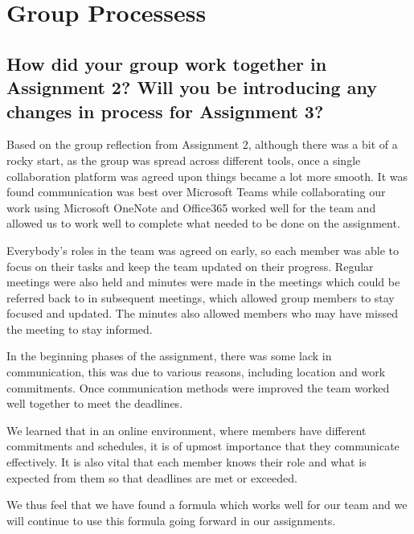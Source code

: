 \documentclass[11pt, oneside, a4paper, titlepage]{article}
\begin{document}
\section{Group Processess}

\subsection{How did your group work together in Assignment 2? Will you be introducing any changes in process for Assignment 3?}
Based on the group reflection from Assignment 2, although there was a bit of a rocky start, as the group was spread across different tools, once a single collaboration platform was agreed upon things became a lot more smooth. It was found communication was best over Microsoft Teams while collaborating our work using Microsoft OneNote and Office365 worked well for the team and allowed us to work well to complete what needed to be done on the assignment. 

Everybody’s roles in the team was agreed on early, so each member was able to focus on their tasks and keep the team updated on their progress. Regular meetings were also held and minutes were made in the meetings which could be referred back to in subsequent meetings, which allowed group members to stay focused and updated. The minutes also allowed members who may have missed the meeting to stay informed.  

In the beginning phases of the assignment, there was some lack in communication, this was due to various reasons, including location and work commitments. Once communication methods were improved the team worked well together to meet the deadlines.  

We learned that in an online environment, where members have different commitments and schedules, it is of upmost importance that they communicate effectively. It is also vital that each member knows their role and what is expected from them so that deadlines are met or exceeded. 

We thus feel that we have found a formula which works well for our team and we will continue to use this formula going forward in our assignments. 
\end{document}
